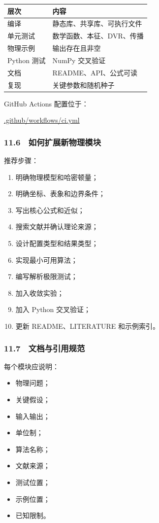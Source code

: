 \documentclass[
]{ctexbook}
\providecommand{\tightlist}{%
  \setlength{\itemsep}{0pt}\setlength{\parskip}{0pt}}
\begin{document}
\begin{longtable}[]{@{}ll@{}}
\toprule
层次 & 内容\tabularnewline
\midrule
\endhead
编译 & 静态库、共享库、可执行文件\tabularnewline
单元测试 & 数学函数、本征、DVR、传播\tabularnewline
物理示例 & 输出存在且非空\tabularnewline
Python 测试 & NumPy 交叉验证\tabularnewline
文档 & README、API、公式可读\tabularnewline
复现 & 关键参数和随机种子\tabularnewline
\bottomrule
\end{longtable}

GitHub Actions 配置位于：

\href{https://github.com/l1Ha/QuantumGeneralModule/blob/main/.github/workflows/ci.yml}{.github/workflows/ci.yml}

\hypertarget{ux5982ux4f55ux6269ux5c55ux65b0ux7269ux7406ux6a21ux5757}{%
\subsubsection{11.6　如何扩展新物理模块}\label{ux5982ux4f55ux6269ux5c55ux65b0ux7269ux7406ux6a21ux5757}}

推荐步骤：

\begin{enumerate}
\def\labelenumi{\arabic{enumi}.}
\tightlist
\item
  明确物理模型和哈密顿量；
\item
  明确坐标、表象和边界条件；
\item
  写出核心公式和近似；
\item
  搜索文献并确认理论来源；
\item
  设计配置类型和结果类型；
\item
  实现最小可用算法；
\item
  编写解析极限测试；
\item
  加入收敛实验；
\item
  加入 Python 交叉验证；
\item
  更新 README、LITERATURE 和示例索引。
\end{enumerate}

\hypertarget{ux6587ux6863ux4e0eux5f15ux7528ux89c4ux8303}{%
\subsubsection{11.7　文档与引用规范}\label{ux6587ux6863ux4e0eux5f15ux7528ux89c4ux8303}}

每个模块应说明：

\begin{itemize}
\tightlist
\item
  物理问题；
\item
  关键假设；
\item
  输入输出；
\item
  单位制；
\item
  算法名称；
\item
  文献来源；
\item
  测试位置；
\item
  示例位置；
\item
  已知限制。
\end{itemize}
\end{document}
